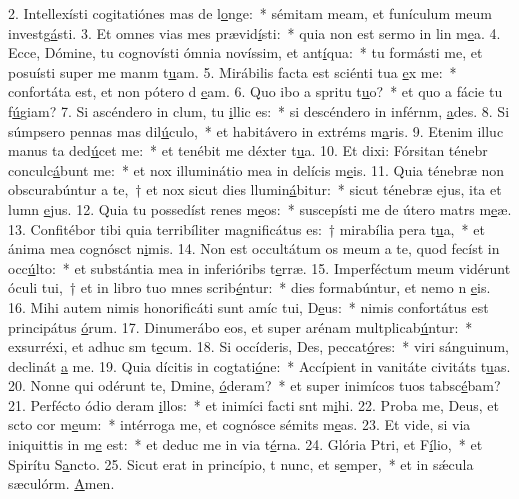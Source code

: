 2. Intellexísti cogitatiónes mas de l\uline{o}nge:~* sémitam meam, et funículum meum investg\uline{á}sti.
3. Et omnes vias mes prævid\uline{í}sti:~* quia non est sermo in lin m\uline{e}a.
4. Ecce, Dómine, tu cognovísti ómnia novíssim, et ant\uline{í}qua:~* tu formásti me, et posuísti super me manm t\uline{u}am.
5. Mirábilis facta est sciénti tua \uline{e}x me:~* confortáta est, et non pótero d \uline{e}am.
6. Quo ibo a spritu t\uline{u}o?~* et quo a fácie tu f\uline{ú}giam?
7. Si ascéndero in clum, tu \uline{i}llic es:~* si descéndero in inférnm, \uline{a}des.
8. Si súmpsero pennas mas dil\uline{ú}culo,~* et habitávero in extréms m\uline{a}ris.
9. Etenim illuc manus ta ded\uline{ú}cet me:~* et tenébit me déxter t\uline{u}a.
10. Et dixi: Fórsitan ténebr conculc\uline{á}bunt me:~* et nox illuminátio mea in delícis m\uline{e}is.
11. Quia ténebræ non obscurabúntur a te,~† et nox sicut dies llumin\uline{á}bitur:~* sicut ténebræ ejus, ita et lumn \uline{e}jus.
12. Quia tu possedíst renes m\uline{e}os:~* suscepísti me de útero matrs m\uline{e}æ.
13. Confitébor tibi quia terribíliter magnificátus es:~† mirabília pera t\uline{u}a,~* et ánima mea cognósct n\uline{i}mis.
14. Non est occultátum os meum a te, quod fecíst in occ\uline{ú}lto:~* et substántia mea in inferióribs t\uline{e}rræ.
15. Imperféctum meum vidérunt óculi tui,~† et in libro tuo mnes scrib\uline{é}ntur:~* dies formabúntur, et nemo n \uline{e}is.
16. Mihi autem nimis honorificáti sunt amíc tui, D\uline{e}us:~* nimis confortátus est principátus \uline{ó}rum.
17. Dinumerábo eos, et super arénam multplicab\uline{ú}ntur:~* exsurréxi, et adhuc sm t\uline{e}cum.
18. Si occíderis, Des, peccat\uline{ó}res:~* viri sánguinum, declinát \uline{a} me.
19. Quia dícitis in cogtati\uline{ó}ne:~* Accípient in vanitáte civitáts t\uline{u}as.
20. Nonne qui odérunt te, Dmine, \uline{ó}deram?~* et super inimícos tuos tabsc\uline{é}bam?
21. Perfécto ódio deram \uline{i}llos:~* et inimíci facti snt m\uline{i}hi.
22. Proba me, Deus, et scto cor m\uline{e}um:~* intérroga me, et cognósce sémits m\uline{e}as.
23. Et vide, si via iniquittis in m\uline{e} est:~* et deduc me in via t\uline{é}rna.
24. Glória Ptri, et F\uline{í}lio,~* et Spirítu S\uline{a}ncto.
25. Sicut erat in princípio, t nunc, et s\uline{e}mper,~* et in sǽcula sæculórm. \uline{A}men.
